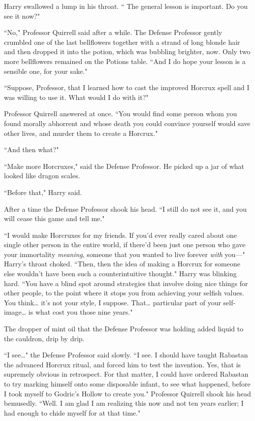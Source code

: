 Harry swallowed a lump in his throat. `` The general lesson is important. Do you see it now?"

``No," Professor Quirrell said after a while. The Defense Professor gently crumbled one of the last bellflowers together with a strand of long blonde hair and then dropped it into the potion, which was bubbling brighter, now. Only two more bellflowers remained on the Potions table. ``And I do hope your lesson is a sensible one, for your sake."

``Suppose, Professor, that I learned how to cast the improved Horcrux spell and I was willing to use it. What would I do with it?"

Professor Quirrell answered at once. ``You would find some person whom you found morally abhorrent and whose death you could convince yourself would save other lives, and murder them to create a Horcrux."

``And then what?"

``Make more Horcruxes," said the Defense Professor. He picked up a jar of what looked like dragon scales.

``Before that," Harry said.

After a time the Defense Professor shook his head. ``I still do not see it, and you will cease this game and tell me."

``I would make Horcruxes for my friends. If you'd ever really cared about one single other person in the entire world, if there'd been just one person who gave your immortality \emph{meaning}, someone that you wanted to live forever \emph{with} you—" Harry's throat choked. ``Then, then the idea of making a Horcrux for someone else wouldn't have been such a counterintuitive thought." Harry was blinking hard. ``You have a blind spot around strategies that involve doing nice things for other people, to the point where it stops you from achieving your selfish values. You think{\ldots} it's not your style, I suppose. That{\ldots} particular part of your self-image{\ldots} is what cost you those nine years."

The dropper of mint oil that the Defense Professor was holding added liquid to the cauldron, drip by drip.

``I see{\ldots}" the Defense Professor said slowly. ``I see. I should have taught Rabastan the advanced Horcrux ritual, and forced him to test the invention. Yes, that is supremely obvious in retrospect. For that matter, I could have ordered Rabastan to try marking himself onto some disposable infant, to see what happened, before I took myself to Godric's Hollow to create you." Professor Quirrell shook his head bemusedly. ``Well. I am glad I am realizing this now and not ten years earlier; I had enough to chide myself for at that time."

